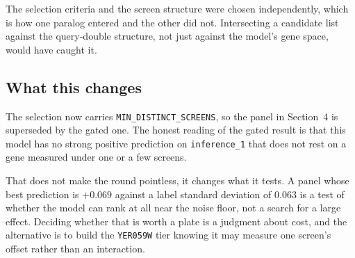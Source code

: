 The selection criteria and the screen structure were chosen independently, which
is how one paralog entered and the other did not. Intersecting a candidate list
against the query-double structure, not just against the model's gene space,
would have caught it.

\subsection{What this changes}

The selection now carries \texttt{MIN\_DISTINCT\_SCREENS}, so the panel in
Section~4 is superseded by the gated one. The honest reading of the gated result
is that this model has no strong positive prediction on \texttt{inference\_1}
that does not rest on a gene measured under one or a few screens.

That does not make the round pointless, it changes what it tests. A panel whose
best prediction is $+0.069$ against a label standard deviation of $0.063$ is a
test of whether the model can rank at all near the noise floor, not a search for
a large effect. Deciding whether that is worth a plate is a judgment about cost,
and the alternative is to build the \texttt{YER059W} tier knowing it may measure
one screen's offset rather than an interaction.

